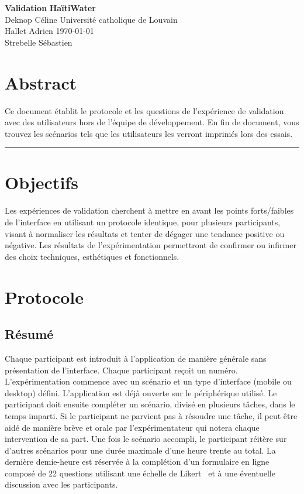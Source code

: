 \documentclass[a4paper, 11pt]{article}
\begin{document}
\noindent
\large\textbf{Validation} \hfill \textbf{HaïtiWater} \\
\normalsize Deknop Céline \hfill Université catholique de Louvain \\
Hallet Adrien \hfill \today \\
Strebelle Sébastien

\section*{Abstract}
    Ce document établit le protocole et les questions de l'expérience de validation avec des utilisateurs hors de l'équipe de développement. En fin de document, vous trouvez les scénarios tels que les utilisateurs les verront imprimés lors des essais.
\hrule

\section{Objectifs}
    Les expériences de validation cherchent à mettre en avant les points forts/faibles de l'interface en utilisant un protocole identique, pour plusieurs participants, visant à normaliser les résultats et tenter de dégager une tendance positive ou négative. Les résultats de l'expérimentation permettront de confirmer ou infirmer des choix techniques, esthétiques et fonctionnels.

\section{Protocole}
    \subsection*{Résumé}
        Chaque participant est introduit à l'application de manière générale sans présentation de l'interface. Chaque participant reçoit un numéro. L'expérimentation commence avec un scénario et un type d'interface (mobile ou desktop) défini. L'application est déjà ouverte sur le périphérique utilisé. Le participant doit ensuite compléter un scénario, divisé en plusieurs tâches, dans le temps imparti. Si le participant ne parvient pas à résoudre une tâche, il peut être aidé de manière brève et orale par l'expérimentateur qui notera chaque intervention de sa part. Une fois le scénario accompli, le participant réitère sur d'autres scénarios pour une durée maximale d'une heure trente au total. La dernière demie-heure est réservée à la complétion d'un formulaire en ligne composé de 22 questions utilisant une échelle de Likert~\cite{wikipediaLikertScale} et à une éventuelle discussion avec les participants.
\end{document}
